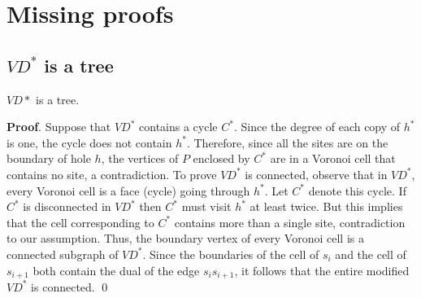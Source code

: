 \section{Missing proofs}
\subsection{$VD^*$ is a tree}\label{a2}
\begin{lemma}
  $VD*$ is a tree.
\end{lemma}
\textbf{Proof}. Suppose that $VD^*$ contains a cycle $C^*$. Since the degree of each copy
of $h^*$ is one, the cycle does not contain $h^*$. Therefore, since all the sites are on
the boundary of hole $h$, the vertices of $P$ enclosed by $C^*$ are in a Voronoi cell
that contains no site, a contradiction. To prove $VD^*$ is connected, observe that in
$VD^*$, every Voronoi cell is a face (cycle) going through $h^*$. Let $C^*$ denote this
cycle. If $C^*$ is disconnected in $VD^*$ then $C^*$ must visit $h^*$ at least twice. But
this implies that the cell corresponding to $C^*$ contains more than a single site,
contradiction to our assumption. Thus, the boundary vertex of every Voronoi cell is a
connected subgraph of $VD^*$. Since the boundaries of the cell of $s_i$ and the cell of
$s_{i+1}$ both contain the dual of the edge $s_is_{i+1}$, it follows that the entire
modified $VD^*$ is connected. \qed

